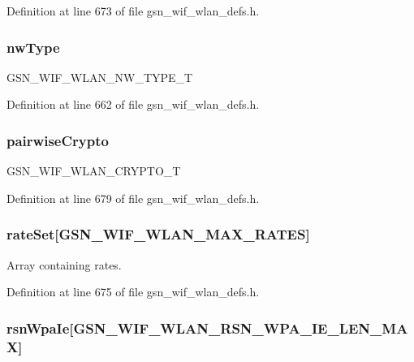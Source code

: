Definition at line 673 of file gsn\_\-wif\_\-wlan\_\-defs.h.

\hypertarget{a00374_aafc3f3af3f4d3ef964d5a573dc140bfa}{
\subsubsection[{nwType}]{ {\bf nwType}}}
\label{a00374_aafc3f3af3f4d3ef964d5a573dc140bfa}
GSN\_\-WIF\_\-WLAN\_\-NW\_\-TYPE\_\-T 

Definition at line 662 of file gsn\_\-wif\_\-wlan\_\-defs.h.

\hypertarget{a00374_aea9ac9a7170aa6715444395f9b97f1ca}{
\subsubsection[{pairwiseCrypto}]{ {\bf pairwiseCrypto}}}
\label{a00374_aea9ac9a7170aa6715444395f9b97f1ca}
GSN\_\-WIF\_\-WLAN\_\-CRYPTO\_\-T 

Definition at line 679 of file gsn\_\-wif\_\-wlan\_\-defs.h.

\hypertarget{a00374_a67df6ac936e9a7862c722c4633410edc}{
\subsubsection[{rateSet}]{ {\bf rateSet}\mbox{[}GSN\_\-WIF\_\-WLAN\_\-MAX\_\-RATES\mbox{]}}}
\label{a00374_a67df6ac936e9a7862c722c4633410edc}
Array containing rates. 

Definition at line 675 of file gsn\_\-wif\_\-wlan\_\-defs.h.

\hypertarget{a00374_ab8ff673f336eaf307e4cd9b42e71e2d6}{
\subsubsection[{rsnWpaIe}]{ {\bf rsnWpaIe}\mbox{[}GSN\_\-WIF\_\-WLAN\_\-RSN\_\-WPA\_\-IE\_\-LEN\_\-MAX\mbox{]}}}
\label{a00374_ab8ff673f336eaf307e4cd9b42e71e2d6}


